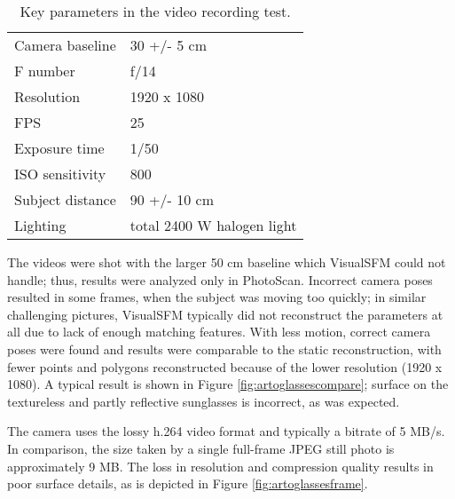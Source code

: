 \begin{table}[h]
	\centering
	\begin{tabular}{l l}
		Camera baseline & 30 +/- 5 cm\\
		F number & f/14\\
		Resolution & 1920 x 1080\\
		FPS & 25\\
		Exposure time & 1/50\\
		ISO sensitivity & 800\\
		Subject distance & 90 +/- 10 cm\\
		Lighting & total 2400 W halogen light\\
	\end{tabular}
	\caption{
		Key parameters in the video recording test. %
	}
	\label{tab:samplevideoparams}
\end{table}

The videos were shot with the larger 50 cm baseline which VisualSFM could not handle; thus, results were analyzed only in PhotoScan.
Incorrect camera poses resulted in some frames, when the subject was moving too quickly; in similar challenging pictures, VisualSFM typically did not reconstruct the parameters at all due to lack of enough matching features.
With less motion, correct camera poses were found and results were comparable to the static reconstruction, with fewer points and polygons reconstructed because of the lower resolution (1920 x 1080).
A typical result is shown in Figure \ref{fig:artoglassescompare}; surface on the textureless and partly reflective sunglasses is incorrect, as was expected.

The camera uses the lossy h.264 video format and typically a bitrate of 5 MB/s.
In comparison, the size taken by a single full-frame JPEG still photo is approximately 9 MB.
The loss in resolution and compression quality results in poor surface details, as is depicted in Figure \ref{fig:artoglassesframe}.



